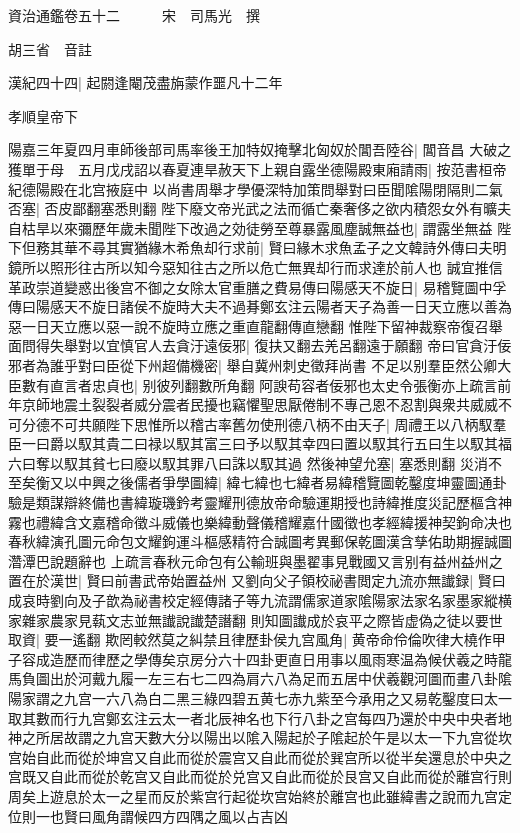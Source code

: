 資治通鑑卷五十二　　　宋　司馬光　撰

胡三省　音註

漢紀四十四|{
	起閼逢閹茂盡旃蒙作噩凡十二年}


孝順皇帝下

陽嘉三年夏四月車師後部司馬率後王加特奴掩擊北匈奴於閶吾陸谷|{
	閶音昌}
大破之獲單于母　五月戊戌詔以春夏連旱赦天下上親自露坐德陽殿東廂請雨|{
	按范書桓帝紀德陽殿在北宫掖庭中}
以尚書周舉才學優深特加策問舉對曰臣聞隂陽閉隔則二氣否塞|{
	否皮鄙翻塞悉則翻}
陛下廢文帝光武之法而循亡秦奢侈之欲内積怨女外有曠夫自枯旱以來彌歷年歲未聞陛下改過之効徒勞至尊暴露風塵誠無益也|{
	謂露坐無益}
陛下但務其華不尋其實猶緣木希魚却行求前|{
	賢曰緣木求魚孟子之文韓詩外傳曰夫明鏡所以照形往古所以知今惡知往古之所以危亡無異却行而求達於前人也}
誠宜推信革政崇道變惑出後宫不御之女除太官重膳之費易傳曰陽感天不旋日|{
	易稽覽圖中孚傳曰陽感天不旋日諸侯不旋時大夫不過朞鄭玄注云陽者天子為善一日天立應以善為惡一日天立應以惡一說不旋時立應之重直龍翻傳直戀翻}
惟陛下留神裁察帝復召舉面問得失舉對以宜慎官人去貪汙遠佞邪|{
	復扶又翻去羌呂翻遠于願翻}
帝曰官貪汙佞邪者為誰乎對曰臣從下州超備機密|{
	舉自冀州刺史徵拜尚書}
不足以别羣臣然公卿大臣數有直言者忠貞也|{
	别彼列翻數所角翻}
阿諛苟容者佞邪也太史令張衡亦上疏言前年京師地震土裂裂者威分震者民擾也竊懼聖思厭倦制不專己恩不忍割與衆共威威不可分德不可共願陛下思惟所以稽古率舊勿使刑德八柄不由天子|{
	周禮王以八柄馭羣臣一曰爵以馭其貴二曰禄以馭其富三曰予以馭其幸四曰置以馭其行五曰生以馭其福六曰奪以馭其貧七曰廢以馭其罪八曰誅以馭其過}
然後神望允塞|{
	塞悉則翻}
災消不至矣衡又以中興之後儒者爭學圖緯|{
	緯七緯也七緯者易緯稽覽圖乾鑿度坤靈圖通卦驗是類謀辯終備也書緯璇璣鈐考靈耀刑德放帝命驗運期授也詩緯推度災記歷樞含神霧也禮緯含文嘉稽命徵斗威儀也樂緯動聲儀稽耀嘉什國徵也孝經緯援神契鉤命决也春秋緯演孔圖元命包文耀鉤運斗樞感精符合誠圖考異郵保乾圖漢含孳佑助期握誠圖濳潭巴說題辭也}
上疏言春秋元命包有公輸班與墨翟事見戰國又言别有益州益州之置在於漢世|{
	賢曰前書武帝始置益州}
又劉向父子領校祕書閲定九流亦無䜟録|{
	賢曰成哀時劉向及子歆為祕書校定經傳諸子等九流謂儒家道家隂陽家法家名家墨家縱横家雜家農家見蓻文志並無䜟說䜟楚譖翻}
則知圖䜟成於哀平之際皆虚偽之徒以要世取資|{
	要一遙翻}
欺罔較然莫之糾禁且律歷卦侯九宫風角|{
	黄帝命伶倫吹律大橈作甲子容成造歷而律歷之學傳矣京房分六十四卦更直日用事以風雨寒温為候伏羲之時龍馬負圖出於河戴九履一左三右七二四為肩六八為足而五居中伏羲觀河圖而畫八卦隂陽家謂之九宫一六八為白二黑三綠四碧五黄七赤九紫至今承用之又易乾鑿度曰太一取其數而行九宫鄭玄注云太一者北辰神名也下行八卦之宫每四乃還於中央中央者地神之所居故謂之九宫天數大分以陽出以隂入陽起於子隂起於午是以太一下九宫從坎宫始自此而從於坤宫又自此而從於震宫又自此而從於巽宫所以從半矣還息於中央之宫既又自此而從於乾宫又自此而從於兑宫又自此而從於艮宫又自此而從於離宫行則周矣上遊息於太一之星而反於紫宫行起從坎宫始終於離宫也此雖緯書之說而九宫定位則一也賢曰風角謂候四方四隅之風以占吉凶}
